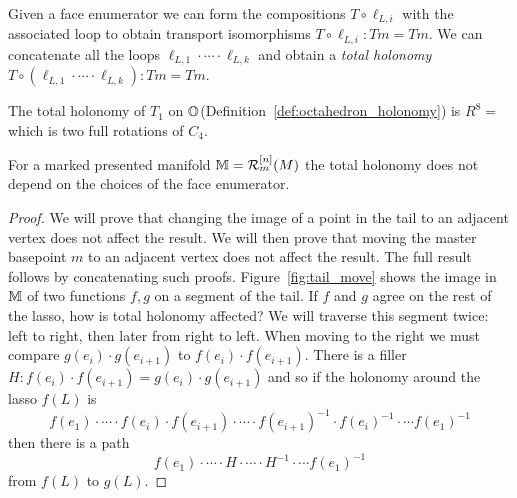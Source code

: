 Given a face enumerator we can form the compositions \( T\circ\ell_{L,i} \) with the associated loop to obtain transport isomorphisms \( T\circ\ell_{L,i}:Tm=Tm \). We can concatenate all the loops \( \ell_{L,1}\cdot\cdots\cdot\ell_{L,k} \) and obtain a \emph{total holonomy} \( T\circ(\ell_{L,1}\cdot\cdots\cdot\ell_{L,k}):Tm=Tm  \).

\begin{mylemma}
The total holonomy of \( T_1 \) on \( \mathbb{O} \)(Definition~\ref{def:octahedron_holonomy}) is \( R^8=\) which is two full rotations of \( C_4 \).
\end{mylemma}

\begin{myprop}
For a marked presented manifold \( \mathbb{M}=\mathcal{R}_m^{[n]}(M) \) the total holonomy does not depend on the choices of the face enumerator.
\end{myprop}
\begin{proof}
We will prove that changing the image of a point in the tail to an adjacent vertex does not affect the result. We will then prove that moving the master basepoint \( m \) to an adjacent vertex does not affect the result. The full result follows by concatenating such proofs. Figure~\ref{fig:tail_move} shows the image in \( \mathbb{M} \) of two functions \( f, g \) on a segment of the tail. If \( f \) and \( g \) agree on the rest of the lasso, how is total holonomy affected? We will traverse this segment twice: left to right, then later from right to left. When moving to the right we must compare \( g(e_i)\cdot g(e_{i+1}) \) to \( f(e_i)\cdot f(e_{i+1}) \). There is a filler \( H:f(e_i)\cdot f(e_{i+1})=g(e_i)\cdot g(e_{i+1}) \) and so if the holonomy around the lasso \( f(L) \) is \[ f(e_1)\cdot\cdots\cdot f(e_i)\cdot f(e_{i+1})\cdot\cdots\cdot f(e_{i+1})^{-1}\cdot f(e_i)^{-1}\cdot\cdots f(e_1)^{-1} \] then there is a path \[ f(e_1)\cdot\cdots\cdot H\cdot\cdots\cdot H^{-1}\cdot\cdots f(e_1)^{-1} \] from \( f(L) \) to \( g(L) \).
\end{proof}

